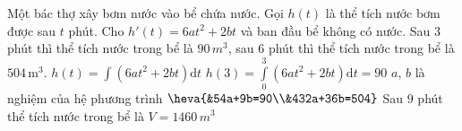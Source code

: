 \begin{ex}%
	Một bác thợ xây bơm nước vào bể chứa nước. Gọi $h(t)$ là thể tích nước bơm được sau $t$ phút. Cho $h'(t)=6a t^2+2b t$ và ban đầu bể không có nước. Sau $3$ phút thì thể tích nước trong bể là $90\,m^3$, sau $6$ phút thì thể tích nước trong bể là $504\,\mathrm{m}^3$. 
	\choiceTF
	{\True $h(t)=\displaystyle\int\left(6a t^2+2b t\right) \mathrm{d} t$ }
	{\True $h(3)=\displaystyle\int\limits_0^3\left(6a t^2+2b t\right) \mathrm{d} t=90$ }
	{\True $a$, $b$ là nghiệm của hệ phương trình $\heva{&54a+9b=90\\&432a+36b=504}$ }
	{ Sau $9$ phút thể tích nước trong bể là $V=1460 \,m^3$ }
\end{ex}

